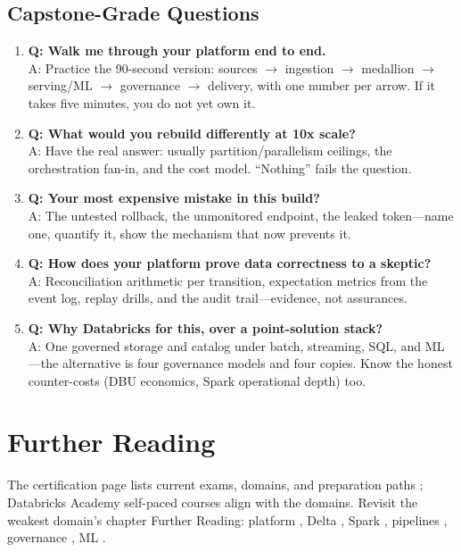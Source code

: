 \subsection{Capstone-Grade Questions}
\begin{enumerate}
    \item \textbf{Q: Walk me through your platform end to end.}\\
    A: Practice the 90-second version: sources $\rightarrow$ ingestion $\rightarrow$ medallion $\rightarrow$ serving/ML $\rightarrow$ governance $\rightarrow$ delivery, with one number per arrow. If it takes five minutes, you do not yet own it.
    \item \textbf{Q: What would you rebuild differently at 10x scale?}\\
    A: Have the real answer: usually partition/parallelism ceilings, the orchestration fan-in, and the cost model. ``Nothing'' fails the question.
    \item \textbf{Q: Your most expensive mistake in this build?}\\
    A: The untested rollback, the unmonitored endpoint, the leaked token---name one, quantify it, show the mechanism that now prevents it.
    \item \textbf{Q: How does your platform prove data correctness to a skeptic?}\\
    A: Reconciliation arithmetic per transition, expectation metrics from the event log, replay drills, and the audit trail---evidence, not assurances.
    \item \textbf{Q: Why Databricks for this, over a point-solution stack?}\\
    A: One governed storage and catalog under batch, streaming, SQL, and ML---the alternative is four governance models and four copies. Know the honest counter-costs (DBU economics, Spark operational depth) too.
\end{enumerate}

\section{Further Reading}
The certification page lists current exams, domains, and preparation paths \cite{databricksCertification}; Databricks Academy self-paced courses align with the domains. Revisit the weakest domain's chapter Further Reading: platform \cite{databricksDocs}, Delta \cite{armbrust2020delta,deltaLakeDocs}, Spark \cite{sparkDocs,chambersZaharia}, pipelines \cite{databricksDLT,databricksWorkflows}, governance \cite{databricksUnityCatalog}, ML \cite{databricksMLflow,databricksMosaicAI}.

